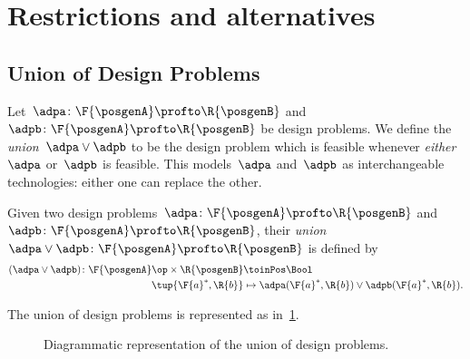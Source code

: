 

\section{Restrictions and alternatives}


\subsection{Union of Design Problems}
Let~$\adpa\colon \F{\posgenA}\profto \R{\posgenB}$ and~$\adpb\colon \F{\posgenA}\profto \R{\posgenB}$ be design problems.
We define the \emph{union}~$\adpa \vee \adpb$ to be the design problem which is feasible whenever \emph{either}~$\adpa$ or~$\adpb$ is feasible.
This models~$\adpa$ and~$\adpb$ as interchangeable technologies: either one can replace the other.

\begin{definition}
    \label{def:union_dp}
    Given two design problems~$\adpa \colon \F{\posgenA} \profto \R{\posgenB}$ and~$\adpb\colon \F{\posgenA} \profto \R{\posgenB}$, their \emph{union}~$\adpa \vee \adpb\colon \F{\posgenA} \profto \R{\posgenB}$ is defined by
    \begin{equation}
        \begin{aligned}
        (\adpa \vee \adpb)
            \colon \F{\posgenA}\op \times \R{\posgenB} & \toinPos \Bool \\
            \tup{\F{a}^*, \R{b}} & \mapsto \adpa(\F{a}^*, \R{b}) \vee \adpb(\F{a}^*, \R{b}).
        \end{aligned}
    \end{equation}
\end{definition}

The union of design problems is represented as in~\cref{fig:uniondp}.

\begin{figure}[h!]
    \begin{center}
    \end{center}
    \caption{Diagrammatic representation of the union of design problems. }
    \label{fig:uniondp}
\end{figure}

